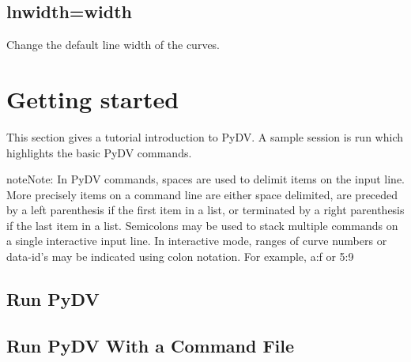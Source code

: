 \documentclass[letterpaper,10pt,english]{sphinxmanual}
\begin{document}
\subsection{lnwidth=width}
\label{\detokenize{pdvrc:lnwidth-width}}
Change the default line width of the curves.


\section{Getting started}
\label{\detokenize{getting_started:getting-started}}\label{\detokenize{getting_started:id1}}\label{\detokenize{getting_started::doc}}
This section gives a tutorial introduction to PyDV. A sample session is run which highlights the basic PyDV commands.

\begin{sphinxadmonition}{note}{Note:}
In PyDV commands, spaces are used to delimit items on the input line. More precisely items on a command line are
either space delimited, are preceded by a left parenthesis if the first item in a list, or terminated by a right
parenthesis if the last item in a list. Semicolons may be used to stack multiple commands on a single interactive
input line. In interactive mode, ranges of curve numbers or data-id’s may be indicated using colon notation.
For example, a:f or 5:9
\end{sphinxadmonition}


\subsection{Run PyDV}
\label{\detokenize{getting_started:run-pydv}}
\begin{sphinxVerbatim}[commandchars=\\\{\}]
\end{sphinxVerbatim}


\subsection{Run PyDV With a Command File}
\label{\detokenize{getting_started:run-pydv-with-a-command-file}}
\begin{sphinxVerbatim}[commandchars=\\\{\}]
  
\end{sphinxVerbatim}
\end{document}
